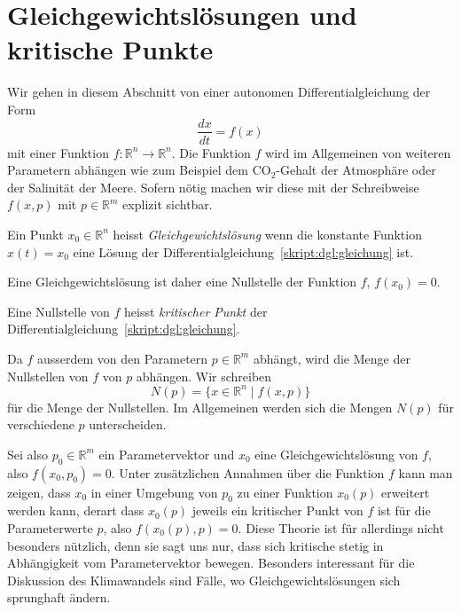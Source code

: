 %
%
%
\section{Gleichgewichtslösungen und kritische Punkte}
Wir gehen in diesem Abschnitt von einer autonomen Differentialgleichung
der Form
\begin{equation}
\frac{dx}{dt} = f(x)
\label{skript:dgl:gleichung}
\end{equation}
mit einer Funktion $f\colon \mathbb R^n \to \mathbb R^n$.
Die Funktion $f$ wird im Allgemeinen von weiteren Parametern abhängen
wie zum Beispiel dem $\text{CO}_2$-Gehalt der Atmosphäre oder der Salinität
der Meere.
Sofern nötig machen wir diese mit der Schreibweise $f(x,p)$ mit
$p\in\mathbb R^m$ explizit sichtbar.

\begin{definition}
Ein Punkt $x_0\in\mathbb R^n$ heisst {\em Gleichgewichtslösung}
wenn die konstante Funktion $x(t)=x_0$ eine Lösung der
Differentialgleichung~\ref{skript:dgl:gleichung} ist.
\end{definition}

Eine Gleichgewichtslösung ist daher eine Nullstelle der Funktion $f$,
$f(x_0)=0$.
\begin{definition}
Eine Nullstelle von $f$ heisst {\em kritischer Punkt} der
Differentialgleichung~\ref{skript:dgl:gleichung}.
\end{definition}

Da $f$ ausserdem von den Parametern $p\in\mathbb R^m$ abhängt,
wird die Menge der Nullstellen von $f$ von $p$ abhängen.
Wir schreiben
\[
N(p) = \{x\in\mathbb R^n\;|\; f(x,p)\}
\]
für die Menge der Nullstellen. 
Im Allgemeinen werden sich die Mengen $N(p)$ für verschiedene $p$ 
unterscheiden.

Sei also $p_0\in\mathbb R^m$ ein Parametervektor und $x_0$ eine
Gleichgewichtslösung von $f$, also $f(x_0,p_0)=0$.
Unter zusätzlichen Annahmen über die Funktion $f$ kann man zeigen,
dass $x_0$ in einer Umgebung von $p_0$ zu einer Funktion
$x_0(p)$ erweitert werden kann, derart dass $x_0(p)$ jeweils ein
kritischer Punkt von $f$ ist für die Parameterwerte $p$, also
$f(x_0(p),p)=0$.
Diese Theorie ist für allerdings nicht besonders nützlich, denn
sie sagt uns nur, dass sich kritische stetig in Abhängigkeit vom
Parametervektor bewegen.
Besonders interessant für die Diskussion des Klimawandels sind
Fälle, wo Gleichgewichtslösungen sich sprunghaft ändern.

